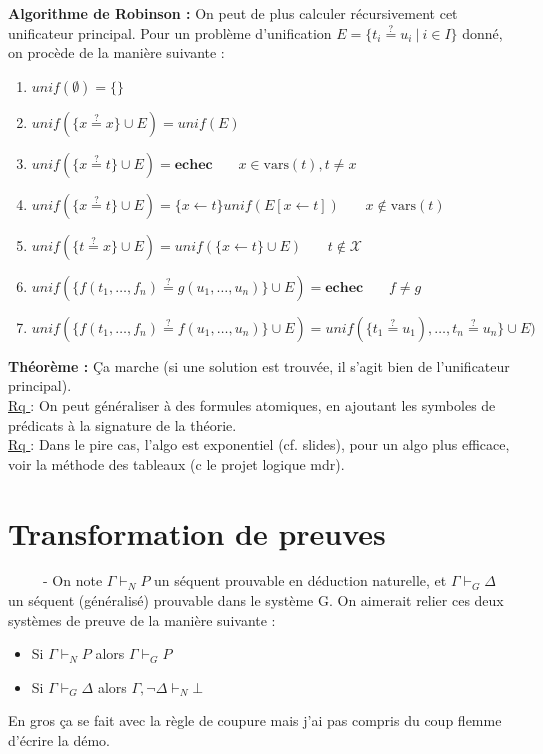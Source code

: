 \documentclass[11pt,a4paper]{article}
\begin{document}
\textbf{Algorithme de Robinson :} On peut de plus calculer récursivement cet unificateur principal. Pour un problème d'unification $E = \{ t_i\stackrel{?}{=} u_i \ | \ i \in I \}$ donné, on procède de la manière suivante :
\begin{enumerate}
\item $unif(\emptyset)=\{\}$
\item $unif(\{x \stackrel{?}{=}x \} \cup E)=unif(E)$
\item $unif(\{x \stackrel{?}{=}t \} \cup E)=\textbf{echec}$ \ \ \ $x \in \text{vars}(t), t\neq x$
\item $unif(\{x \stackrel{?}{=}t \} \cup E)=\{x \leftarrow t\}unif(E[x\leftarrow t])$ \ \ \ $x \notin \text{vars}(t)$
\item $unif(\{t \stackrel{?}{=} x \} \cup E)=unif(\{x \leftarrow t\}\cup E)$ \ \ \ $t \notin \mathcal{X}$
\item $unif(\{f(t_1,\dots,f_n)\stackrel{?}{=}g(u_1,\dots,u_n)\}\cup E)=\textbf{echec}$ \ \ \ $f \neq g$
\item $unif(\{f(t_1,\dots,f_n)\stackrel{?}{=}f(u_1,\dots,u_n)\}\cup E)=unif(\{t_1\stackrel{?}{=}u_1),\dots,t_n\stackrel{?}{=}u_n\}\cup E)$ \\
\end{enumerate}

\textbf{Théorème :} Ça marche (si une solution est trouvée, il s’agit bien de l’unificateur principal).\\

\underline{Rq }: On peut généraliser à des formules atomiques, en ajoutant les symboles de prédicats à la signature de la théorie. \\

\underline{Rq }: Dans le pire cas, l'algo est exponentiel (cf. slides), pour un algo plus efficace, voir la méthode des tableaux (c le projet logique mdr).

\section{Transformation de preuves}

\ \ \ \ \ - On note $\Gamma \vdash_N P$ un séquent prouvable en déduction naturelle, et $\Gamma \vdash_G \Delta$ un séquent (généralisé) prouvable dans le système G. On aimerait relier ces deux systèmes de preuve de la manière suivante :
\begin{itemize}
\item Si $\Gamma \vdash_N P$ alors $\Gamma \vdash_G P$
\item Si $\Gamma \vdash_G \Delta$ alors $\Gamma, \lnot \Delta \vdash_N \bot$ \\
\end{itemize}

En gros ça se fait avec la règle de coupure mais j'ai pas compris du coup flemme d'écrire la démo. \\
\end{document}
